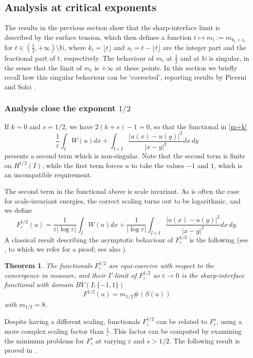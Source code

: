 \documentclass{article}
\newtheorem{theorem}[lemma]{Theorem}
\newcommand{\e}{\varepsilon}
\begin{document}
\subsection{Analysis at critical exponents}
The results in the previous section show that the sharp-interface limit is described by the surface tension, which then defines a function $t\mapsto m_t:=m_{k_t+s_t}$ for $t\in (\frac12,+\infty)\setminus\mathbb N$, where $k_t= \lfloor t\rfloor$
and $s_t= t-\lfloor t\rfloor$ are the integer part and the fractional part of $t$, respectively. The behaviour of $m_t$ at $\frac12$ and at $\mathbb N$ is singular, in the sense that the limit of  $m_t$ is $+\infty$ at these points. In this section we briefly recall how this singular behaviour can be `corrected', reporting results by Picerni \cite{Picerni} and Solci \cite{}. 


\subsubsection{Analysis close the exponent $1/2$}
If $k=0$ and $s=1/2$, we have $2(k+s)-1=0$, so that the functional in \eqref{m+k} 
$$
\frac1\e\int_I W(u)dx+ \int_{I\times I}\frac{|u(x)-u(y)|^2}{|x-y|^{2}}dx\,dy
$$
presents a second term which is non-singular. Note that the second term is finite on $H^{1/2}(I)$, while the first term forces $u$ to take the values $-1$ and $1$, which is an incompatible requirement.


The second term in the functional above is scale invariant. 
As is often the case for scale-invariant energies, the correct scaling turns out to be logarithmic,
and we define
\begin{equation}\label{m+k1/2}
F^{1/2}_\e(u)=\frac1{\e|\log\e|}\int_I W(u)dx+ \frac1{|\log\e|}\int_{I\times I}\frac{|u(x)-u(y)|^2}{|x-y|^{2}}dx\,dy.
\end{equation}
A classical result describing the asymptotic behaviour of $F^{1/2}_\e$ is the following (see \cite{ABS,SV}, to which we refer for a proof; see also \cite{PaVi}).

\begin{theorem}
The functionals $F^{1/2}_\e$ are equi-coercive  with respect to the convergence in measure, and their
$\Gamma$-limit of $F^{1/2}_\e$ as $\e\to 0$ is the sharp-interface functional with domain $BV(I;\{-1,1\})$ 
$$
F^{1/2}(u)= m_{1/2} \#(S(u))
$$
with $m_{1/2}=8$.
\end{theorem}


Despite having a different scaling, functionals $F^{1/2}_\e$ can be related to $F^s_\e$, using a more complex scaling factor than $\frac1\e$. This factor can be computed by examining the minimum problems for $F^s_\e$ at varying $\e$ and $s>1/2$. The following result is proved in \cite{Picerni}.
\end{document}

